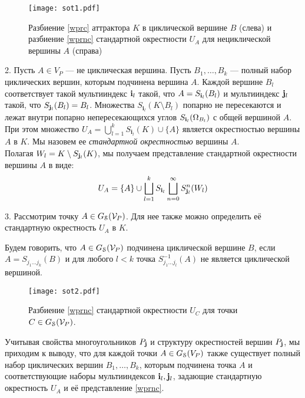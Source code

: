 \begin{figure}[H]
    \centering
    \texttt{[image: sot1.pdf]}
    \caption{Разбиение \eqref{wprc} аттрактора $K$ в циклической вершине $B$ (слева) и разбиение \eqref{wprnc} стандартной окрестности $U_A$  для нециклической вершины $A$ (справа)}
    \label{img:sot1}
\end{figure}

2. Пусть $A\in V_P$ --- не циклическая вершина. 
Пусть $B_1, \ldots, B_k$ --- полный набор циклических вершин, которым подчинена вершина $A$.
Каждой вершине $B_l$ соответствует такой мультииндекс  ${\bf{i}}_l$ такой, что $A=S_{{\bf{i}}_l}(B_l)$ и мультииндекс ${\bf{j}}_l$ такой, что $S_{{\bf{j}}_l}(B_l)=B_l$. 
Множества $ S_{\bm{i}_l}(K\setminus B_l)$ попарно не пересекаются и лежат   внутри попарно непересекающихся углов $S_{{\bf{i}}_l}(\Omega_{B_l})$ с общей вершиной $A$. 
При этом множество $U_A=\bigcup\limits_{l=1}^k S_{\bm{i}_l}(K)\cup\{A\}$ является окрестностью вершины $A$ в $K$. Мы назовем ее {\em стандартной окрестностью} вершины $A$.\\
Полагая $W_l=K\setminus S_{{\bf{j}}_l}(K)$, мы получаем представление стандартной окрестности вершины $A$ в виде:
\begin{equation} \label{wprnc} 
U_A=\{A\}\cup\bigsqcup\limits_{l=1}^k S_{{\bf{i}}_l}\bigsqcup\limits_{n=0}^\infty S_{{\bf{j}}_l}^n(W_l)
\end{equation}

3. Рассмотрим точку $A\in G_{\EuScript S} ({\mathcal V}_P)$. 
Для нее также можно определить её стандартную окрестность $U_A$ в $K$.

\begin{definition}
Будем говорить, что $A\in G_{\EuScript S} ({\mathcal V}_P)$ подчинена циклической вершине $B$, если $A=S_{j_1...j_k}(B)$ и
 для любого $l<k$ точка $S_{j_1...j_l}^{-1}(A)$ не является циклической вершиной. 
\end{definition}

\begin{figure}[H]
    \centering
    \texttt{[image: sot2.pdf]}
    \caption{Разбиение \eqref{wprnc} стандартной окрестности $U_C$  для точки $C\in G_{\EuScript S} ({\mathcal V}_P)$.}
    \label{img:sot2}
\end{figure}

Учитывая свойства многоугольников $P_{\bf{j}}$ и структуру окрестностей вершин $P_{\bf{j}}$, мы приходим к выводу, что для каждой точки $A\in G_{\EuScript S} (V_P)$ также существует полный набор циклических вершин $B_1, \ldots, B_k$, которым подчинена точка $A$ и соответствующие наборы мультииндексов ${\bf{i}}_l, {\bf{j}}_l$, задающие  стандартную окрестность $U_A$ и её представление \eqref{wprnc}.





